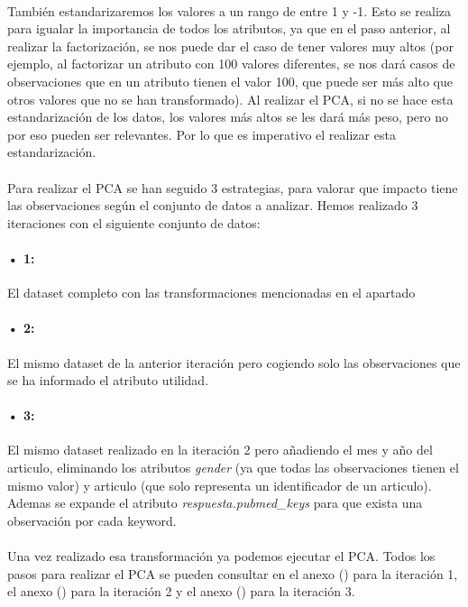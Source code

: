 \paragraph{}
También estandarizaremos los valores a un rango de entre 1 y -1. Esto se realiza para igualar la importancia de todos los atributos, ya que en el paso anterior, al realizar la factorización, se nos puede dar el caso de tener valores muy altos (por ejemplo, al factorizar un atributo con 100 valores diferentes, se nos dará casos de observaciones que en un atributo tienen el valor 100, que puede ser más alto que otros valores que no se han transformado). Al realizar el PCA, si no se hace esta estandarización de los datos, los valores más altos se les dará más peso, pero no por eso pueden ser relevantes. Por lo que es imperativo el realizar esta estandarización.

\paragraph{}
Para realizar el PCA se han seguido 3 estrategias, para valorar que impacto tiene las observaciones según el conjunto de datos a analizar. Hemos realizado 3 iteraciones con el siguiente conjunto de datos:

\paragraph{• 1: } El dataset completo con las transformaciones mencionadas en el apartado 

\paragraph{• 2: } El mismo dataset de la anterior iteración pero cogiendo solo las observaciones que se ha informado el atributo utilidad.

\paragraph{• 3: } El mismo dataset realizado en la iteración 2 pero añadiendo el mes y año del articulo, eliminando los atributos \textit{gender} (ya que todas las observaciones tienen el mismo valor) y articulo (que solo representa un identificador de un articulo). Ademas se expande el atributo \textit{respuesta.pubmed\_keys} para que exista una observación por cada keyword.

\paragraph{}
Una vez realizado esa transformación ya podemos ejecutar el PCA. Todos los pasos para realizar el PCA se pueden consultar en el anexo () para la iteración 1, el anexo () para la iteración 2 y el anexo () para la iteración 3.